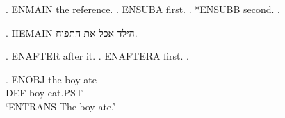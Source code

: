\documentclass[11pt]{article}
\begin{document}
\ex. ENMAIN the reference.
\a. ENSUBA first.
\b. *ENSUBB second.
\z.

\begin{otherlanguage}{hebrew}
\ex. HEMAIN הילד אכל את התפוח.
\end{otherlanguage}

\ex. ENAFTER after it.
\a. ENAFTERA first.
\z.

\exg. ENOBJ the boy ate\\ DEF boy eat.PST\\
\glt `ENTRANS The boy ate.'
\end{document}
